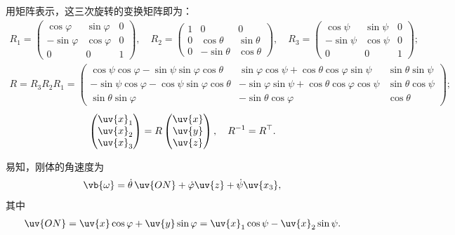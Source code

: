 用矩阵表示，这三次旋转的变换矩阵即为：
\begin{align*}
	R_1 = \begin{pmatrix}
		\cos \varphi  & \sin \varphi & 0 \\
		-\sin \varphi & \cos \varphi & 0 \\
		0             & 0            & 1
	\end{pmatrix}, \quad
	R_2 = \begin{pmatrix}
		1 & 0            & 0           \\
		0 & \cos \theta  & \sin \theta \\
		0 & -\sin \theta & \cos \theta
	\end{pmatrix}, \quad
	R_3 = \begin{pmatrix}
		\cos \psi  & \sin \psi & 0 \\
		-\sin \psi & \cos \psi & 0 \\
		0          & 0         & 1
	\end{pmatrix};
\end{align*}
\begin{align*}
	R = R_3 R_2 R_1 = \begin{pmatrix}
		\cos \psi \cos \varphi - \sin \psi \sin \varphi \cos \theta  & \sin \varphi \cos \psi + \cos \theta \cos \varphi \sin \psi  & \sin \theta \sin \psi \\
		-\sin \psi \cos \varphi - \cos \psi \sin \varphi \cos \theta & -\sin \varphi \sin \psi + \cos \theta \cos \varphi \cos \psi & \sin \theta \cos \psi \\
		\sin \theta \sin \varphi                                     & -\sin \theta \cos \varphi                                    & \cos \theta
	\end{pmatrix};
\end{align*}
\begin{align*}
	\begin{pmatrix}
		\uv{x}_1 \\
		\uv{x}_2 \\
		\uv{x}_3
	\end{pmatrix} = R \begin{pmatrix}
		\uv{x} \\
		\uv{y} \\
		\uv{z}
	\end{pmatrix}, \quad R^{-1} = R^\top.
\end{align*}

易知，刚体的角速度为
\begin{align*}
	\vb{\omega} = \dot{\theta}\, \uv{ON} + \dot{\varphi} \uv{z} + \dot{\psi} \uv{x_3},
\end{align*}
其中
\begin{align*}
	\uv{ON} = \uv{x} \cos \varphi + \uv{y} \sin \varphi = \uv{x}_1 \cos \psi - \uv{x}_2 \sin \psi.
\end{align*}

